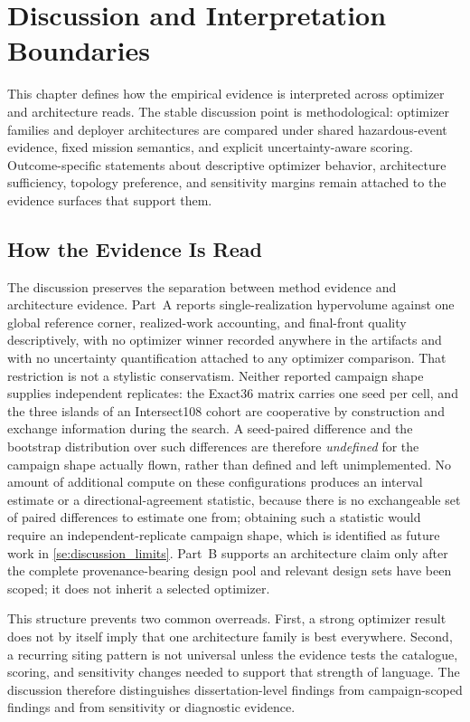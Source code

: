\chapter{Discussion and Interpretation Boundaries} \label{ch:discussion}

This chapter defines how the empirical evidence is interpreted across optimizer and architecture reads. The stable discussion point is methodological: optimizer families and deployer architectures are compared under shared hazardous-event evidence, fixed mission semantics, and explicit uncertainty-aware scoring. Outcome-specific statements about descriptive optimizer behavior, architecture sufficiency, topology preference, and sensitivity margins remain attached to the evidence surfaces that support them.

\section{How the Evidence Is Read} \label{se:discussion_reading}

The discussion preserves the separation between method evidence and architecture evidence. Part~A reports single-realization hypervolume against one global reference corner, realized-work accounting, and final-front quality descriptively, with no optimizer winner recorded anywhere in the artifacts and with no uncertainty quantification attached to any optimizer comparison. That restriction is not a stylistic conservatism. Neither reported campaign shape supplies independent replicates: the Exact36 matrix carries one seed per cell, and the three islands of an Intersect108 cohort are cooperative by construction and exchange information during the search. A seed-paired difference and the bootstrap distribution over such differences are therefore \emph{undefined} for the campaign shape actually flown, rather than defined and left unimplemented. No amount of additional compute on these configurations produces an interval estimate or a directional-agreement statistic, because there is no exchangeable set of paired differences to estimate one from; obtaining such a statistic would require an independent-replicate campaign shape, which is identified as future work in \cref{se:discussion_limits}. Part~B supports an architecture claim only after the complete provenance-bearing design pool and relevant design sets have been scoped; it does not inherit a selected optimizer.

This structure prevents two common overreads. First, a strong optimizer result does not by itself imply that one architecture family is best everywhere. Second, a recurring siting pattern is not universal unless the evidence tests the catalogue, scoring, and sensitivity changes needed to support that strength of language. The discussion therefore distinguishes dissertation-level findings from campaign-scoped findings and from sensitivity or diagnostic evidence.

